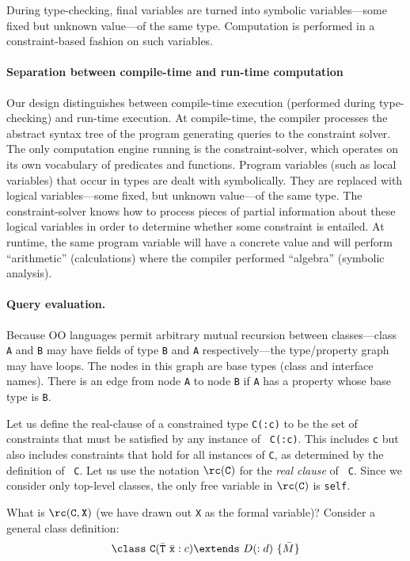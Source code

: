 During type-checking, final variables are turned into symbolic
variables---some fixed but unknown value---of the same type.
Computation is performed in a constraint-based fashion on such
variables.

\paragraph{Separation between compile-time and run-time computation}
Our design distinguishes between compile-time execution (performed
during type-checking) and run-time execution. At compile-time, the
compiler processes the abstract syntax tree of the program generating
queries to the constraint solver. The only computation engine running
is the constraint-solver, which operates on its own vocabulary of
predicates and functions. Program variables (such as local variables)
that occur in types are dealt with symbolically. They are replaced
with logical variables---some fixed, but unknown value---of the same
type. The constraint-solver knows how to process pieces of partial
information about these logical variables in order to determine
whether some constraint is entailed. At runtime, the same program
variable will have a concrete value and will perform ``arithmetic''
(calculations) where the compiler performed ``algebra'' (symbolic
analysis).

\paragraph{Query evaluation.}

Because OO languages permit arbitrary mutual recursion between
classes---class {\tt A} and {\tt B} may have fields of type {\tt B} and
{\tt A} respectively---the type/property graph may have loops. The nodes
in this graph are base types (class and interface names). There is an
edge from node {\tt A} to node {\tt B} if {\tt A} has a property whose
base type is {\tt B}.

Let us define the real-clause of a constrained type {\tt C(:c)} to be
the set of constraints that must be satisfied by any instance of {\tt
C(:c)}. This includes {\tt c} but also includes constraints that hold
for all instances of {\tt C}, as determined by the definition of {\tt
C}. Let us use the notation $\rc({\tt C})$ for the {\em real clause} of {\tt
C}. Since we consider only top-level classes, the only free variable in 
$\rc({\tt C})$ is {\tt self}.

What is $\rc({\tt C}, {\tt X})$ (we have drawn out {\tt X} as the
formal variable)? Consider a general class definition:
$$\class\ {\tt C}(\bar{\tt T}\ \bar{\tt x} : c)\extends\ D(:d)\ \{\bar{M}\}$$

